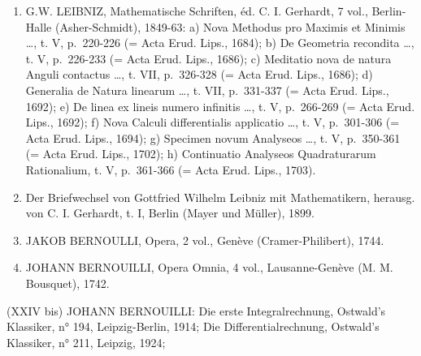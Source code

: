 \begin{enumerate}
\def\labelenumi{(\Roman{enumi})}
\setcounter{enumi}{20}
\item
  G.W. LEIBNIZ, Mathematische Schriften, éd. C. I. Gerhardt, 7 vol., Berlin-Halle (Asher-Schmidt), 1849-63: a) Nova Methodus pro Maximis et Minimis \ldots, t. V, p.~220-226 (= Acta Erud. Lips., 1684); b) De Geometria recondita \ldots, t. V, p.~226-233 (= Acta Erud. Lips., 1686); c) Meditatio nova de natura Anguli contactus \ldots, t. VII, p.~326-328 (= Acta Erud. Lips., 1686); d) Generalia de Natura linearum \ldots, t. VII, p.~331-337 (= Acta Erud. Lips., 1692); e) De linea ex lineis numero infinitis \ldots, t. V, p.~266-269 (= Acta Erud. Lips., 1692); f) Nova Calculi differentialis applicatio \ldots, t. V, p.~301-306 (= Acta Erud. Lips., 1694); g) Specimen novum Analyseos \ldots, t. V, p.~350-361 (= Acta Erud. Lips., 1702); h) Continuatio Analyseos Quadraturarum Rationalium, t. V, p.~361-366 (= Acta Erud. Lips., 1703).
\item
  Der Briefwechsel von Gottfried Wilhelm Leibniz mit Mathematikern, herausg. von C. I. Gerhardt, t. I, Berlin (Mayer und Müller), 1899.
\item
  JAKOB BERNOULLI, Opera, 2 vol., Genève (Cramer-Philibert), 1744.
\item
  JOHANN BERNOUILLI, Opera Omnia, 4 vol., Lausanne-Genève (M. M. Bousquet), 1742.
\end{enumerate}

(XXIV bis) JOHANN BERNOUILLI: Die erste Integralrechnung, Ostwald's Klassiker, n° 194, Leipzig-Berlin, 1914; Die Differentialrechnung, Ostwald's Klassiker, n° 211, Leipzig, 1924;

